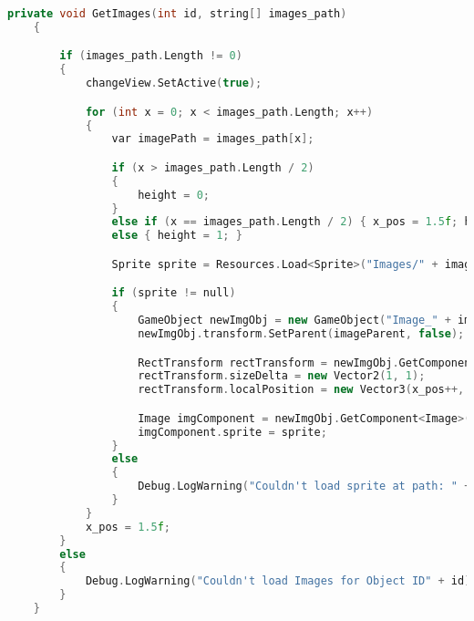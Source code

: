 \begin{lstlisting}[language=C++, caption={Method used to load artifact images and displayed them in the Images Gallery.}, label={lst:artifact_images}]
      private void GetImages(int id, string[] images_path)
    {

        if (images_path.Length != 0)
        {
            changeView.SetActive(true);

            for (int x = 0; x < images_path.Length; x++)
            {
                var imagePath = images_path[x];

                if (x > images_path.Length / 2)
                {
                    height = 0;
                }
                else if (x == images_path.Length / 2) { x_pos = 1.5f; height = 0; }
                else { height = 1; }

                Sprite sprite = Resources.Load<Sprite>("Images/" + imagePath);

                if (sprite != null)
                {
                    GameObject newImgObj = new GameObject("Image_" + imagePath, typeof(RectTransform), typeof(CanvasRenderer), typeof(Image));
                    newImgObj.transform.SetParent(imageParent, false);

                    RectTransform rectTransform = newImgObj.GetComponent<RectTransform>();
                    rectTransform.sizeDelta = new Vector2(1, 1);
                    rectTransform.localPosition = new Vector3(x_pos++, height, 0);

                    Image imgComponent = newImgObj.GetComponent<Image>();
                    imgComponent.sprite = sprite;
                }
                else
                {
                    Debug.LogWarning("Couldn't load sprite at path: " + imagePath);
                }
            }
            x_pos = 1.5f;
        }
        else
        {
            Debug.LogWarning("Couldn't load Images for Object ID" + id);
        }
    }
\end{lstlisting}

